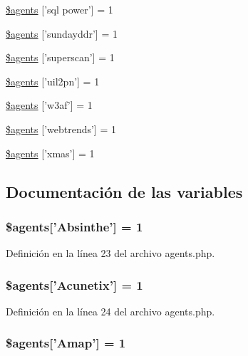 \begin{DoxyCompactItemize}
\item 
\hyperlink{agents_8php_ae7d242e1aa3742a70cb00a1ff4b753b9}{\$agents} \mbox{[}'sql power'\mbox{]} = 1
\item 
\hyperlink{agents_8php_a47c2bf8eef71497cac545a01e488fc22}{\$agents} \mbox{[}'sundayddr'\mbox{]} = 1
\item 
\hyperlink{agents_8php_a59a813d5930a63d34b1f824f7fcc5661}{\$agents} \mbox{[}'superscan'\mbox{]} = 1
\item 
\hyperlink{agents_8php_ae0b07ad8389c28d41e2c14d16fdd73d3}{\$agents} \mbox{[}'uil2pn'\mbox{]} = 1
\item 
\hyperlink{agents_8php_aa91ec749a378bdf7cffc0114b6a884dc}{\$agents} \mbox{[}'w3af'\mbox{]} = 1
\item 
\hyperlink{agents_8php_aeb191d4a82f4aa743c8edf2a3971cde6}{\$agents} \mbox{[}'webtrends'\mbox{]} = 1
\item 
\hyperlink{agents_8php_a75699f659be719d1339958cf2cfa182d}{\$agents} \mbox{[}'xmas'\mbox{]} = 1
\end{DoxyCompactItemize}


\subsection{Documentación de las variables}
\hypertarget{agents_8php_a26354307c4e8f742e9a1835503de3a49}{
\subsubsection[{\$agents}]{\setlength{\rightskip}{0pt plus 5cm}\$agents\mbox{[}'Absinthe'\mbox{]} = 1}}\label{agents_8php_a26354307c4e8f742e9a1835503de3a49}


Definición en la línea 23 del archivo agents.\-php.

\hypertarget{agents_8php_abbdedf5e446a9a99c06c8b32e8caf46e}{
\subsubsection[{\$agents}]{\setlength{\rightskip}{0pt plus 5cm}\$agents\mbox{[}'Acunetix'\mbox{]} = 1}}\label{agents_8php_abbdedf5e446a9a99c06c8b32e8caf46e}


Definición en la línea 24 del archivo agents.\-php.

\hypertarget{agents_8php_a7e39730f201c353bf8ce0dff5b3088c1}{
\subsubsection[{\$agents}]{\setlength{\rightskip}{0pt plus 5cm}\$agents\mbox{[}'Amap'\mbox{]} = 1}}\label{agents_8php_a7e39730f201c353bf8ce0dff5b3088c1}


